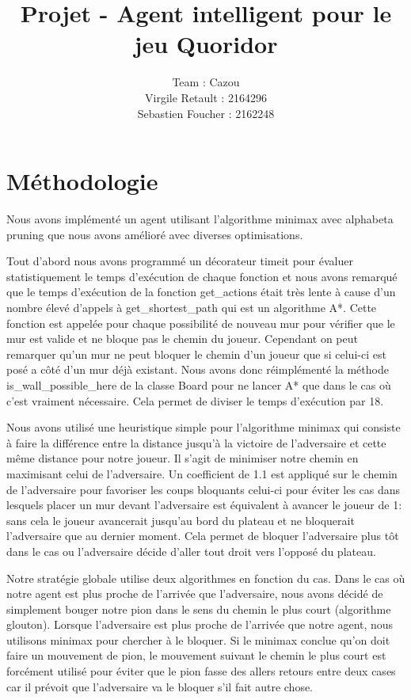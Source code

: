 \documentclass[12pt]{article}
\title{Projet - Agent intelligent pour le jeu Quoridor}
\author{
  Team : Cazou\\
  Virgile Retault : 2164296\\
  Sebastien Foucher : 2162248
}
\begin{document}
\maketitle

\vspace{-45pt}

\section*{Méthodologie}

Nous avons implémenté un agent utilisant l'algorithme minimax avec alphabeta pruning que nous avons amélioré avec diverses optimisations.

Tout d'abord nous avons programmé un décorateur timeit pour évaluer statistiquement le temps d'exécution de chaque fonction et nous avons remarqué que le temps d'exécution de la fonction get\_actions était très lente à cause d'un nombre élevé d'appels à get\_shortest\_path qui est un algorithme A*. Cette fonction est appelée pour chaque possibilité de nouveau mur pour vérifier que le mur est valide et ne bloque pas le chemin du joueur. Cependant on peut remarquer qu'un mur ne peut bloquer le chemin d'un joueur que si celui-ci est posé a côté d'un mur déjà existant. Nous avons donc réimplémenté la méthode is\_wall\_possible\_here de la classe Board pour ne lancer A* que dans le cas où c'est vraiment nécessaire. Cela permet de diviser le temps d'exécution par 18. 

Nous avons utilisé une heuristique simple pour l'algorithme minimax qui consiste à faire la différence entre la distance jusqu'à la victoire de l'adversaire et cette même distance pour notre joueur. Il s'agit de minimiser notre chemin en maximisant celui de l'adversaire. Un coefficient de 1.1 est appliqué sur le chemin de l'adversaire pour favoriser les coups bloquants celui-ci pour éviter les cas dans lesquels placer un mur devant l'adversaire est équivalent à avancer le joueur de 1: sans cela le joueur avancerait jusqu'au bord du plateau et ne bloquerait l'adversaire que au dernier moment. Cela permet de bloquer l'adversaire plus tôt dans le cas ou l'adversaire décide d'aller tout droit vers l'opposé du plateau. 

Notre stratégie globale utilise deux algorithmes en fonction du cas. Dans le cas où notre agent est plus proche de l'arrivée que l'adversaire, nous avons décidé de simplement bouger notre pion dans le sens du chemin le plus court (algorithme glouton). Lorsque l'adversaire est plus proche de l'arrivée que notre agent, nous utilisons minimax pour chercher à le bloquer. Si le minimax conclue qu'on doit faire un mouvement de pion, le mouvement suivant le chemin le plus court est forcément utilisé pour éviter que le pion fasse des allers retours entre deux cases car il prévoit que l'adversaire va le bloquer s'il fait autre chose. 
\end{document}
